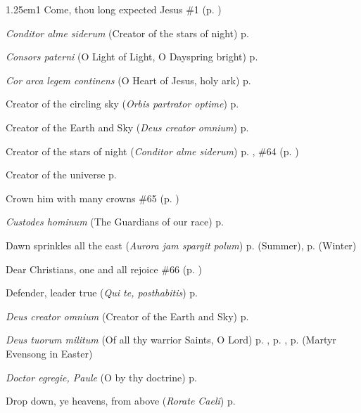 \begin{hangparas}{1.25em}{1}
Come, thou long expected Jesus \dotfill \#1 (p. \pageref{Hymn1})
\par\noindent
\textit{Conditor alme siderum} (Creator of the stars of night) \dotfill p. \pageref{FirstAdventEvensongHymn}
\par\noindent
\textit{Consors paterni} (O Light of Light, O Dayspring bright) \dotfill p. \pageref{TuesdayInvitatory}
\par\noindent
\textit{Cor arca legem continens} (O Heart of Jesus, holy ark) \dotfill p. \pageref{CompassionMattins}
\par\noindent
Creator of the circling sky (\textit{Orbis partrator optime}) \dotfill p. \pageref{GuardianAngelsMattins}
\par\noindent
Creator of the Earth and Sky (\textit{Deus creator omnium}) \dotfill p. \pageref{WeekdayInvitatory}
\par\noindent
Creator of the stars of night (\textit{Conditor alme siderum}) \dotfill p. \pageref{FirstAdventEvensongHymn}, \#64 (p. \pageref{Hymn64})
\par\noindent
Creator of the universe \dotfill p. \pageref{EliasInvitatory}
\par\noindent
Crown him with many crowns \dotfill \#65 (p. \pageref{Hymn65})
\par\noindent
\textit{Custodes hominum} (The Guardians of our race) \dotfill p. \pageref{GuardianAngelsEvensong}
\par\noindent
Dawn sprinkles all the east (\textit{Aurora jam spargit polum}) \dotfill p. \pageref{SaturdayMattinsSummer} (Summer), p. \pageref{SaturdayMattinsWinter} (Winter)
\par\noindent
Dear Christians, one and all rejoice \dotfill \#66 (p. \pageref{Hymn66})
\par\noindent
Defender, leader true (\textit{Qui te, posthabitis}) \dotfill p. \pageref{MaurusEvensong}
\par\noindent
\textit{Deus creator omnium} (Creator of the Earth and Sky) \dotfill p. \pageref{WeekdayInvitatory}
\par\noindent
\textit{Deus tuorum militum} (Of all thy warrior Saints, O Lord) \dotfill p. \pageref{StephenEvensong}, p. \pageref{MartyrEvensong}, p. \pageref{MartyrEvensongEaster} (Martyr Evensong in Easter)
\par\noindent
\textit{Doctor egregie, Paule} (O by thy doctrine) \dotfill p. \pageref{PaulEvensong}
\par\noindent
Drop down, ye heavens, from above (\textit{Rorate Caeli}) \dotfill p. \pageref{AdventProse}

\end{hangparas}
